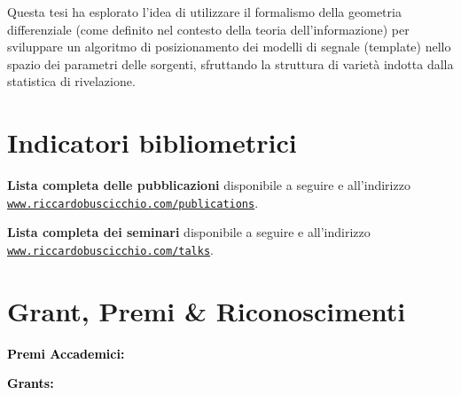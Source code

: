 Questa tesi ha esplorato l'idea di utilizzare il formalismo della geometria differenziale (come definito nel contesto della teoria dell'informazione) per sviluppare un algoritmo di posizionamento dei modelli di segnale (template) nello spazio dei parametri delle sorgenti, sfruttando la struttura di varietà indotta dalla statistica di rivelazione.

\section{Indicatori bibliometrici}



\textbf{Lista completa delle pubblicazioni} disponibile 
a seguire e
all'indirizzo \\
\href{http://www.riccardobuscicchio.com/publications}{\texttt{www.riccardobuscicchio.com/publications}}.

%

\textbf{Lista completa dei seminari} disponibile
a seguire e
all'indirizzo \\
\href{http://www.riccardobuscicchio.com/talks}{\texttt{www.riccardobuscicchio.com/talks}}.

\section{Grant, Premi \& Riconoscimenti}

\textbf{\textcolor{black}{Premi Accademici:}}
\vspace{0.1cm}

\vspace{-0.1cm}
\vspace{-0.1cm}

\vspace{0.2cm}

\textbf{\textcolor{black}{Grants:}}
\vspace{0.1cm}


\vspace{-0.1cm}


